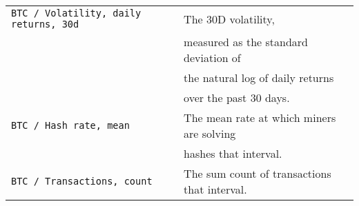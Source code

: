 \begin{table}[htbp]
\begin{threeparttable}
\begin{tabular}{ll}
    \texttt{BTC / Volatility, daily returns, 30d} & The 30D volatility, \\ & measured as the standard deviation of \\ & the natural log of daily returns \\ & over the past 30 days. \\
    \texttt{BTC / Hash rate, mean} & The mean rate at which miners are solving \\ & hashes that interval. \\
    \texttt{BTC / Transactions, count} & The sum count of transactions that interval. \\
    \bottomrule
    \end{tabular}
    \end{threeparttable}
\end{table}
